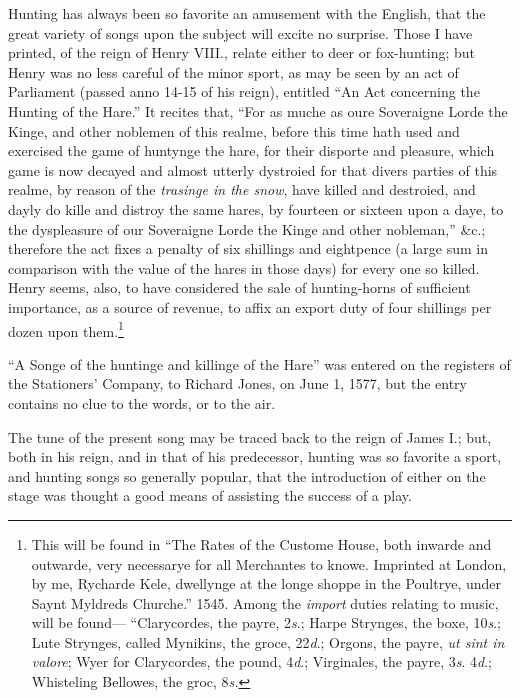Hunting has always been so favorite an amusement with the English, that the
great variety of songs upon the subject will excite no surprise. Those I have
printed, of the reign of Henry VIII., relate either to deer or fox-hunting; but
Henry was no less careful of the minor sport, as may be seen by an act of
Parliament (passed anno 14-15 of his reign), entitled “An Act concerning
the Hunting of the Hare.” It recites that, “For as muche as oure Soveraigne
Lorde the Kinge, and other noblemen of this realme, before this time hath
used and exercised the game of huntynge the hare, for their disporte and
pleasure, which game is now decayed and almost utterly dystroied for that
divers parties of this realme, by reason of the \textit{trasinge in the snow}, have killed
and destroied, and dayly do kille and distroy the same hares, by fourteen or sixteen
upon a daye, to the dyspleasure of our Soveraigne Lorde the Kinge and
other nobleman,” \&c.; therefore the act fixes a penalty of six shillings and eightpence
(a large sum in comparison with the value of the hares in those days) for 
every one so killed. Henry seems, also, \pagebreak to have considered the sale of hunting-horns 
of sufficient importance, as a source of revenue, to affix an export duty of
four shillings per dozen upon them.\footnote{\textit{}
This will be found in “The Rates of the Custome
House, both inwarde and outwarde, very necessarye
for all Merchantes to knowe. Imprinted at London, by
me, Rycharde Kele, dwellynge at the longe shoppe in the
Poultrye, under Saynt Myldreds Churche.” 1545. Among
the \textit{import} duties relating to music, will be found—
“Clarycordes, the payre, 2\textit{s}.; Harpe Strynges, the boxe,
10\textit{s}.; Lute Strynges, called Mynikins, the groce, 22\textit{d}.;
Orgons, the payre, \textit{ut sint in valore}; Wyer for Clarycordes,
the pound, 4\textit{d}.; Virginales, the payre, 3\textit{s}. 4\textit{d}.;
Whisteling Bellowes, the groc, 8\textit{s.}}


“A Songe of the huntinge and killinge of the Hare” was entered on the
registers of the Stationers’ Company, to Richard Jones, on June 1, 1577, but the
entry contains no clue to the words, or to the air.

The tune of the present song may be traced back to the reign of James I.;
but, both in his reign, and in that of his predecessor, hunting was so favorite a
sport, and hunting songs so generally popular, that the introduction of either on
the stage was thought a good means of assisting the success of a play.

